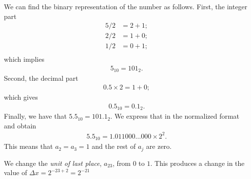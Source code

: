 \begin{questions}

\begin{solution}
We can find the binary representation of the number as follows. First, the integer part
\begin{align*}
5/2 &= 2+1;\\
2/2 &= 1+0;\\
1/2 &= 0+1;\\
\end{align*}
which implies
\begin{align*}
5_{10}=101_2.
\end{align*}
Second, the decimal part
\begin{align*}
0.5\times 2=1+0;
\end{align*}
which gives
\begin{align*}
0.5_{10}=0.1_2.
\end{align*}
Finally, we have that $5.5_{10}=101.1_2$. We express that in the normalized format and obtain
\begin{align*}
5.5_{10}=1.011000\dots 000\times 2^2.
\end{align*}
This means that $a_2=a_3=1$ and the rest of $a_j$ are zero.
\end{solution}
\begin{solution}
We change the \textit{unit of last place}, $a_{23}$, from $0$ to $1$. This produces a change in the value of $\Delta x=2^{-23+2}=2^{-21}$
\end{solution}
\end{questions}